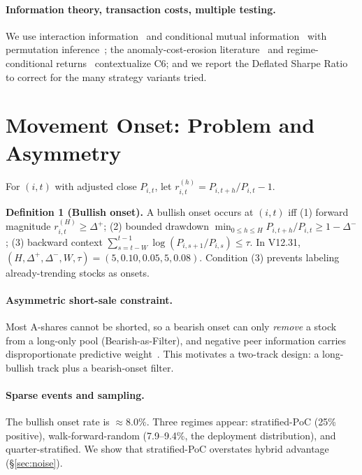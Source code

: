 \documentclass[sigconf,nonacm]{acmart}
\begin{document}
\paragraph{Information theory, transaction costs, multiple testing.} We use interaction
information~\cite{mcgill1954} and conditional mutual information~\cite{coverthomas2006}
with permutation inference~\cite{ojala2010permutation}; the anomaly-cost-erosion
literature~\cite{novymarx2016taxonomy} and regime-conditional returns~\cite{cooper2004market}
contextualize C6; and we report the Deflated Sharpe Ratio~\cite{bailey2014deflated} to
correct for the many strategy variants tried.

\section{Movement Onset: Problem and Asymmetry}\label{sec:problem}

For $(i,t)$ with adjusted close $P_{i,t}$, let $r^{(h)}_{i,t}=P_{i,t+h}/P_{i,t}-1$.

\noindent\textbf{Definition 1 (Bullish onset).} A bullish onset occurs at $(i,t)$ iff
(1) forward magnitude $r^{(H)}_{i,t}\ge\Delta^+$; (2) bounded drawdown
$\min_{0\le h\le H}P_{i,t+h}/P_{i,t}\ge 1-\Delta^-$; (3) backward context
$\sum_{s=t-W}^{t-1}\log(P_{i,s+1}/P_{i,s})\le\tau$. In V12.31,
$(H,\Delta^+,\Delta^-,W,\tau)=(5,0.10,0.05,5,0.08)$. Condition (3) prevents labeling
already-trending stocks as onsets.

\paragraph{Asymmetric short-sale constraint.} Most A-shares cannot be shorted, so a
bearish onset can only \emph{remove} a stock from a long-only pool (Bearish-as-Filter),
and negative peer information carries disproportionate predictive
weight~\cite{cooper2004market}. This motivates a two-track design: a long-bullish track
plus a bearish-onset filter.

\paragraph{Sparse events and sampling.} The bullish onset rate is $\approx 8.0\%$.
Three regimes appear: stratified-PoC (25\% positive), walk-forward-random (7.9--9.4\%,
the deployment distribution), and quarter-stratified. We show that stratified-PoC
overstates hybrid advantage (\S\ref{sec:noise}).
\end{document}
